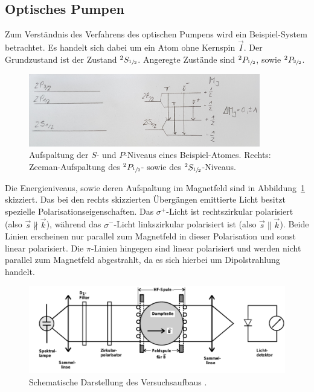 \subsection{Optisches Pumpen}
%
Zum Verständnis des Verfahrens des optischen Pumpens wird ein Beispiel-System
betrachtet. Es handelt sich dabei um ein Atom ohne Kernspin $\vec{I}$. Der
Grundzustand ist der Zustand $^2S_{\sfrac{1}{2}}$. Angeregte Zustände sind
$^2P_{\sfrac{1}{2}}$, sowie $^2P_{\sfrac{3}{2}}$.
%
\begin{figure}[htb]
  \centering
  \includegraphics[width=0.9\textwidth]{figures/Beispiel.jpg}
  \caption{Aufspaltung der $S$- und $P$-Niveaus eines Beispiel-Atomes. Rechts:
  Zeeman-Aufspaltung des $^2P_{\sfrac{1}{2}}$- sowie des
  $^2S_{\sfrac{1}{2}}$-Niveaus.}
  \label{fig:beispiel}
\end{figure}

Die Energieniveaus, sowie deren Aufspaltung im Magnetfeld sind in
Abbildung~\ref{fig:beispiel} skizziert. Das bei den rechts skizzierten
Übergängen emittierte Licht besitzt spezielle Polarisationseigenschaften. Das
$\sigma^+$-Licht ist rechtszirkular polarisiert (also
$\vec{s}\nparallel\vec{k}$), während das $\sigma^-$-Licht linkszirkular
polarisiert ist (also $\vec{s}\parallel\vec{k}$). Beide Linien erscheinen nur
parallel zum Magnetfeld in dieser Polarisation und sonst linear polarisiert.
Die $\pi$-Linien hingegen sind linear polarisiert und werden nicht parallel zum
Magnetfeld abgestrahlt, da es sich hierbei um Dipolstrahlung handelt.
%
\begin{figure}[htb]
  \centering
  \includegraphics[width=\textwidth]{figures/Versuchsaufbau.pdf}
  \caption{Schematische Darstellung des Versuchsaufbaus \cite{V21}.}
  \label{fig:aufbau}
\end{figure}

